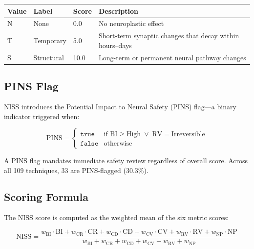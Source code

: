 \begin{table}[H]
\centering
\small
\begin{tabular}{@{}l l l p{7cm}@{}}
\toprule
\textbf{Value} & \textbf{Label} & \textbf{Score} & \textbf{Description} \\
\midrule
N & None       & 0.0  & No neuroplastic effect \\
T & Temporary  & 5.0  & Short-term synaptic changes that decay within hours--days \\
S & Structural & 10.0 & Long-term or permanent neural pathway changes \\
\bottomrule
\end{tabular}
\end{table}

\subsection{PINS Flag}

NISS introduces the Potential Impact to Neural Safety (PINS) flag---a
binary indicator triggered when:

\begin{equation}
\text{PINS} = \begin{cases}
  \texttt{true} & \text{if } \text{BI} \geq \text{High} \;\lor\; \text{RV} = \text{Irreversible} \\
  \texttt{false} & \text{otherwise}
\end{cases}
\end{equation}

A PINS flag mandates immediate safety review regardless of overall score.
Across all 109 techniques, 33 are PINS-flagged (30.3\%).

\subsection{Scoring Formula}

The NISS score is computed as the weighted mean of the six metric scores:

\begin{equation}
\text{NISS} = \frac{w_{\text{BI}} \cdot \text{BI} + w_{\text{CR}} \cdot \text{CR} + w_{\text{CD}} \cdot \text{CD} + w_{\text{CV}} \cdot \text{CV} + w_{\text{RV}} \cdot \text{RV} + w_{\text{NP}} \cdot \text{NP}}
              {w_{\text{BI}} + w_{\text{CR}} + w_{\text{CD}} + w_{\text{CV}} + w_{\text{RV}} + w_{\text{NP}}}
\label{eq:niss}
\end{equation}

